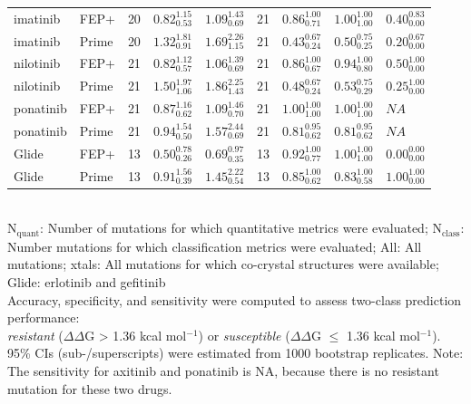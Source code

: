 \documentclass[phd,tocprelim]{cornell}
\begin{document}
\begin{landscape}
\begin{table}[p]
\begin{tabularx}{\linewidth}{X X | c X X | c X X X}
		imatinib & FEP+ & 20 & $0.82_{0.53}^{1.15}$ & $1.09_{0.69}^{1.43}$ & 21 & $0.86_{0.71}^{1.00}$ & $1.00_{1.00}^{1.00}$ & $0.40_{0.00}^{0.83}$ \\ 
		imatinib & Prime & 20 & $1.32_{0.91}^{1.81}$ & $1.69_{1.15}^{2.26}$ & 21 & $0.43_{0.24}^{0.67}$ & $0.50_{0.25}^{0.75}$ & $0.20_{0.00}^{0.67}$ \\ 
		nilotinib & FEP+ & 21 & $0.82_{0.57}^{1.12}$ & $1.06_{0.69}^{1.39}$ & 21 & $0.86_{0.67}^{1.00}$ & $0.94_{0.80}^{1.00}$ & $0.50_{0.00}^{1.00}$ \\ 
		nilotinib & Prime & 21 & $1.50_{1.06}^{1.97}$ & $1.86_{1.43}^{2.25}$ & 21 & $0.48_{0.24}^{0.67}$ & $0.53_{0.29}^{0.75}$ & $0.25_{0.00}^{1.00}$ \\ 
		ponatinib & FEP+ & 21 & $0.87_{0.62}^{1.16}$ & $1.09_{0.70}^{1.46}$ & 21 & $1.00_{1.00}^{1.00}$ & $1.00_{1.00}^{1.00}$ & $NA$ \\ 
		ponatinib & Prime & 21 & $0.94_{0.50}^{1.54}$ & $1.57_{0.69}^{2.44}$ & 21 & $0.81_{0.62}^{0.95}$ & $0.81_{0.62}^{0.95}$ & $NA$ \\ 
		Glide & FEP+ & 13 & $0.50_{0.26}^{0.78}$ & $0.69_{0.35}^{0.97}$ & 13 & $0.92_{0.77}^{1.00}$ & $1.00_{1.00}^{1.00}$ & $0.00_{0.00}^{0.00}$ \\ 
		Glide & Prime & 13 & $0.91_{0.39}^{1.56}$ & $1.45_{0.54}^{2.22}$ & 13 & $0.85_{0.62}^{1.00}$ & $0.83_{0.58}^{1.00}$ & $1.00_{0.00}^{1.00}$ \\
		\bottomrule
	\end{tabularx}
	\small
	\smallskip
	\\
	{N$_\mathrm{quant}$}: Number of mutations for which quantitative metrics were evaluated;
	{N$_\mathrm{class}$}: Number mutations for which classification metrics were evaluated;
	{All}: All mutations;
	{xtals}: All mutations for which co-crystal structures were available;
	{Glide}: erlotinib and gefitinib\\
	Accuracy, specificity, and sensitivity were computed to assess two-class prediction performance:\\
	\emph{resistant} ($\Delta \Delta$G > 1.36 kcal mol$^{-1}$) or \emph{susceptible} ($\Delta \Delta$G $\le$ 1.36 kcal mol$^{-1}$).\\
	95\% CIs (sub-/superscripts) were estimated from 1000 bootstrap replicates.
	Note: The sensitivity for axitinib and ponatinib is NA, because there is no resistant mutation for these two drugs.
\end{table}
\end{landscape}
\end{document}

